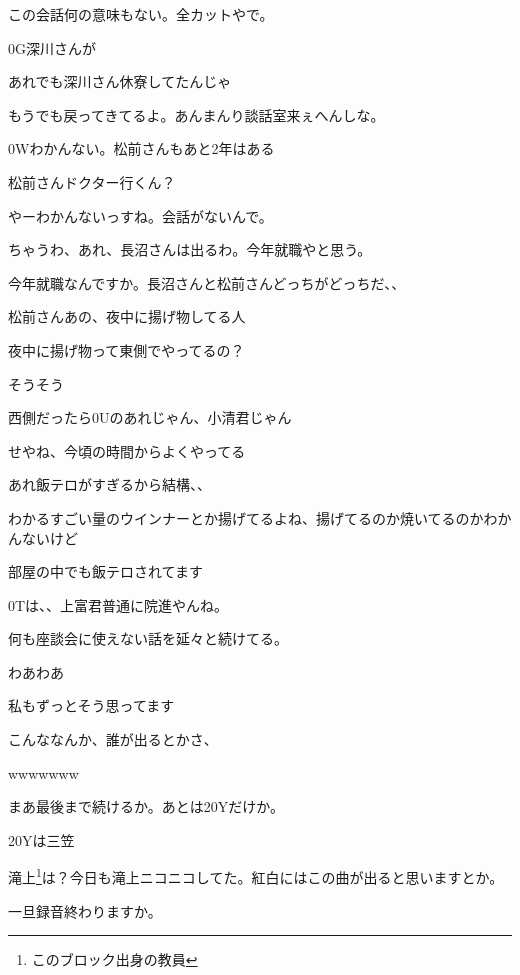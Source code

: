 \begin{multicols}{3}
この会話何の意味もない。全カットやで。

0G深川さんが

あれでも深川さん休寮してたんじゃ

もうでも戻ってきてるよ。あんまんり談話室来ぇへんしな。

0Wわかんない。松前さんもあと2年はある

松前さんドクター行くん？

やーわかんないっすね。会話がないんで。

ちゃうわ、あれ、長沼さんは出るわ。今年就職やと思う。

今年就職なんですか。長沼さんと松前さんどっちがどっちだ、、

松前さんあの、夜中に揚げ物してる人

夜中に揚げ物って東側でやってるの？

そうそう

西側だったら0Uのあれじゃん、小清君じゃん

せやね、今頃の時間からよくやってる

あれ飯テロがすぎるから結構、、

わかるすごい量のウインナーとか揚げてるよね、揚げてるのか焼いてるのかわかんないけど

部屋の中でも飯テロされてます

0Tは、、上富君普通に院進やんね。

何も座談会に使えない話を延々と続けてる。

わあわあ

私もずっとそう思ってます

こんななんか、誰が出るとかさ、

wwwwwww

まあ最後まで続けるか。あとは20Yだけか。

20Yは三笠

滝上\footnote{このブロック出身の教員}は？今日も滝上ニコニコしてた。紅白にはこの曲が出ると思いますとか。

\vspace{5mm}


\noindent{}

一旦録音終わりますか。


\end{multicols}
